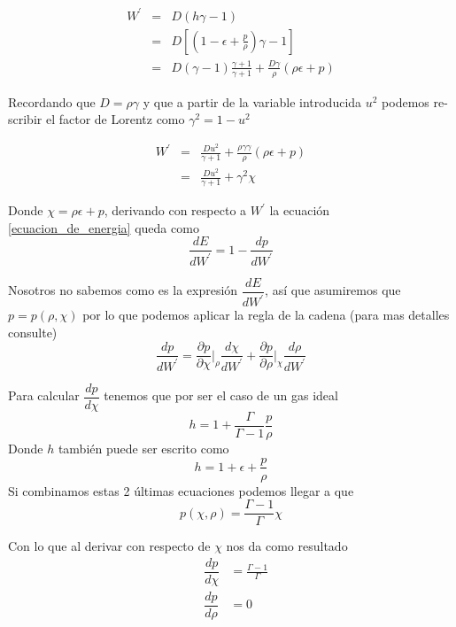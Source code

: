\documentclass[12pt,a4paper]{book}
\begin{document}
\begin{eqnarray*}
 W^{'}& = &D(h \gamma -1)\\
&=& D\left[ \left(1-\epsilon+ \frac{p}{\rho}\right) \gamma - 1 \right]\\
&=& D \left(\gamma-1 \right) \frac{\gamma+1}{\gamma+1}+\frac{D \gamma }{\rho}\left(\rho \epsilon + p \right)
\end{eqnarray*}

Recordando que $D=\rho \gamma$ y que a partir de la variable introducida $u^{2}$ podemos re-scribir el factor de Lorentz como $\gamma^{2} = 1- u^{2}$

\begin{eqnarray}\label{W_prima}
\nonumber W^{'}&=&\frac{D u^{2}}{\gamma + 1}
+\frac{\rho\gamma \gamma}{ \rho }\left(\rho \epsilon + p \right)\\
&=& \frac{D u^{2}}{\gamma + 1} + \gamma^{2} \chi
\end{eqnarray}

Donde $\chi=\rho \epsilon + p$, derivando con respecto a $W^{'}$ la ecuación \ref{ecuacion_de_energia} queda como
\begin{equation}\label{derivada_E_W}
\dfrac{dE}{dW^{'}}=1-\dfrac{dp}{dW^{'}}
\end{equation}

Nosotros no sabemos como es la expresión $\dfrac{dE}{dW^{'}}$, así que asumiremos que $p=p(\rho, \chi)$ por lo que podemos aplicar la regla de la cadena (para mas detalles consulte)
\begin{equation}\label{cadena}
\dfrac{dp}{dW^{'}}=\dfrac{\partial p}{\partial\chi}\Bigg |_{\rho} \dfrac{d\chi}{dW^{'}} + \dfrac{\partial p}{\partial \rho}\Big |_{\chi} \dfrac{d \rho}{d W^{'}}
\end{equation}

Para calcular $\dfrac{dp}{d\chi}$ tenemos que por ser el caso de un gas ideal
\begin{equation}
h=1+\frac{\Gamma}{\Gamma-1}\frac{p}{\rho}
\end{equation}
Donde $h$ también puede ser escrito como
\begin{equation}
h=1+\epsilon+\frac{p}{\rho}
\end{equation}
Si combinamos estas 2 últimas ecuaciones podemos llegar a que 
\begin{equation}
p(\chi,\rho)=\frac{\Gamma-1}{\Gamma}\chi
\end{equation}

Con lo que al derivar con respecto de $\chi$ nos da como resultado
\begin{eqnarray}\label{der_presion}
& \dfrac{d p}{d \chi}&=\frac{\Gamma-1}{\Gamma}\\ &\dfrac{d p}{d \rho}&= 0
\end{eqnarray}
\end{document}
